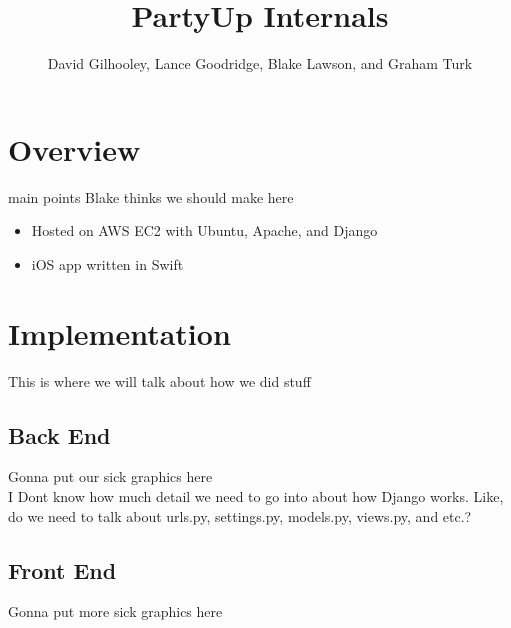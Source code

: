 \documentclass[12pt]{article}
\title{PartyUp Internals}
\author{David Gilhooley, Lance Goodridge, Blake Lawson, and Graham Turk}
\begin{document}
\pagestyle{plain}

\maketitle

\section{Overview}

main points Blake thinks we should make here

\begin{itemize}
\item Hosted on AWS EC2 with Ubuntu, Apache, and Django
\item iOS app written in Swift
\end{itemize}

\section{Implementation}

This is where we will talk about how we did stuff

\subsection{Back End}

Gonna put our sick graphics here \\
I Dont know how much detail we need to go into about how
Django works. Like, do we need to talk about urls.py, settings.py,
models.py, views.py, and etc.?

\subsection{Front End}

Gonna put more sick graphics here
\end{document}
